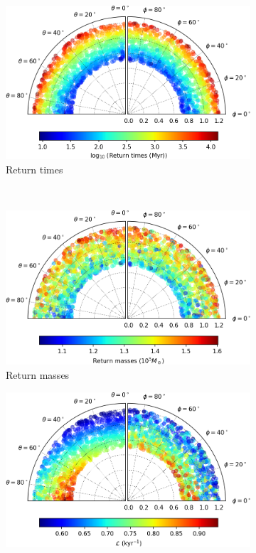 \begin{figure}[h]
    \centering
    \begin{subfigure}[t]{0.4\textwidth}
        \includegraphics[width = \textwidth]{"../Files/Week 13/images/19_time"}
        \caption{Return times}
    \end{subfigure}
    ~ 
    \begin{subfigure}[t]{0.4\textwidth}
        \includegraphics[width=\textwidth]{"../Files/Week 13/images/19_mass"}
        \caption{Return masses}
    \end{subfigure}
    \begin{subfigure}[t]{0.4\textwidth}
        \includegraphics[width=\textwidth]{"../Files/Week 13/images/19_lyapunov"}

\end{subfigure}
\end{figure}
